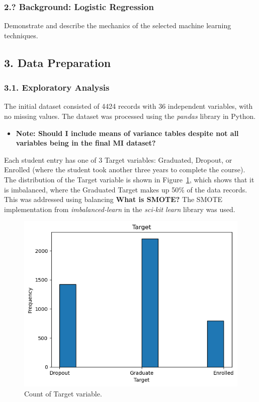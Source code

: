 \documentclass[11pt]{article}
\begin{document}
\newpage
\subsubsection*{2.? Background: Logistic Regression}
Demonstrate and describe the mechanics of the selected machine learning techniques.

\newpage
\subsection*{3. Data Preparation}
\subsubsection*{3.1. Exploratory Analysis}
The initial dataset consisted of 4424 records with 36 independent variables, with no missing values. The dataset was processed using the \textit{pandas} library in Python.

\begin{itemize}
    \item{\textbf{Note: Should I include means of variance tables despite not all variables being in the final MI dataset?}}
\end{itemize}

Each student entry has one of 3 Target variables: Graduated, Dropout, or Enrolled (where the student took another three years to complete the course). The distribution of the Target variable is shown in Figure~\ref{fig:target}, which shows that it is imbalanced, where the Graduated Target makes up 50\% of the data records. This was addressed using balancing \textbf{What is SMOTE?} The SMOTE implementation from \textit{imbalanced-learn} in the \textit{sci-kit learn} library was used.

\begin{figure} [H]
    \centering
    \includegraphics[width=0.8\linewidth]{target_plot}
    \caption{Count of Target variable.}\label{fig:target}
  \end{figure}  
\end{document}
